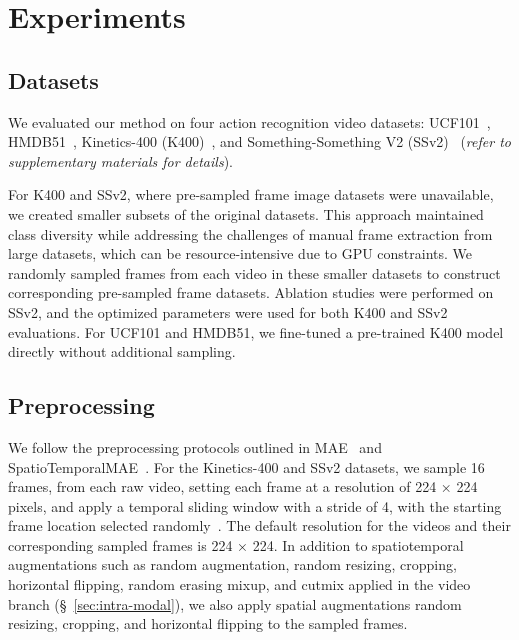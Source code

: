 \section{Experiments}
\label{sec:experiments}


\subsection{Datasets} 



We evaluated our method on four action recognition video datasets: UCF101~\cite{soomro2012ucf101}, HMDB51~\cite{kuehne2011hmdb}, Kinetics-400 (K400)~\cite{kay2017kinetics}, and Something-Something V2 (SSv2)~\cite{goyal2017something} (\textit{refer to supplementary materials for details}).

For K400 and SSv2, where pre-sampled frame image datasets were unavailable, we created smaller subsets of the original datasets. This approach maintained class diversity while addressing the challenges of manual frame extraction from large datasets, which can be resource-intensive due to GPU constraints. We randomly sampled frames from each video in these smaller datasets to construct corresponding pre-sampled frame datasets. Ablation studies were performed on SSv2, and the optimized parameters were used for both K400 and SSv2 evaluations. For UCF101 and HMDB51, we fine-tuned a pre-trained K400 model directly without additional sampling.


\subsection{Preprocessing}

We follow the preprocessing protocols outlined in MAE~\cite{he2022masked} and SpatioTemporalMAE~\cite{feichtenhofer2022masked}. For the Kinetics-400 and SSv2 datasets, we sample 16 frames, from each raw video, setting each frame at a resolution of 224 × 224 pixels, and apply a temporal sliding window with a stride of 4, with the starting frame location selected randomly~\cite{feichtenhofer2022masked}. The default resolution for the videos and their corresponding sampled frames is 224 × 224. In addition to spatiotemporal augmentations such as random augmentation, random resizing, cropping,
horizontal flipping, random erasing mixup, and cutmix applied in the video branch (\S~\ref{sec:intra-modal}), we also apply spatial augmentations random resizing, cropping, and horizontal flipping to the sampled frames.



